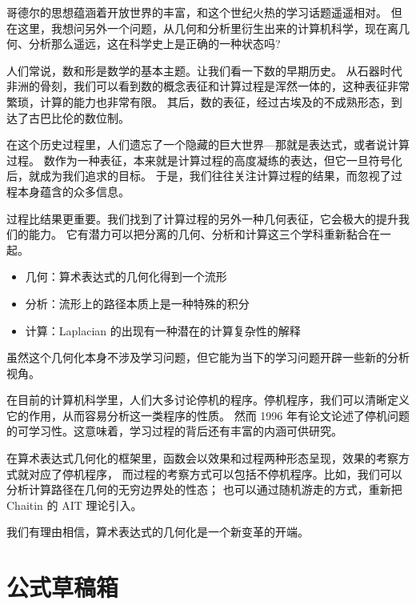 \documentclass[a4paper,12pt]{article}
\numberwithin{definition}{section}
\numberwithin{lemma}{section}
\numberwithin{proposition}{section}
\numberwithin{theorem}{section}
\numberwithin{grammar}{section}
\numberwithin{program}{section}
\numberwithin{convention}{section}
\numberwithin{corollary}{section}
\begin{document}
哥德尔的思想蕴涵着开放世界的丰富，和这个世纪火热的学习话题遥遥相对。
但在这里，我想问另外一个问题，从几何和分析里衍生出来的计算机科学，现在离几何、分析那么遥远，这在科学史上是正确的一种状态吗?

人们常说，数和形是数学的基本主题。让我们看一下数的早期历史。
从石器时代非洲的骨刻，我们可以看到数的概念表征和计算过程是浑然一体的，这种表征非常繁琐，计算的能力也非常有限。
其后，数的表征，经过古埃及的不成熟形态，到达了古巴比伦的数位制。

在这个历史过程里，人们遗忘了一个隐藏的巨大世界—那就是表达式，或者说计算过程。
数作为一种表征，本来就是计算过程的高度凝练的表达，但它一旦符号化后，就成为我们追求的目标。
于是，我们往往关注计算过程的结果，而忽视了过程本身蕴含的众多信息。

过程比结果更重要。我们找到了计算过程的另外一种几何表征，它会极大的提升我们的能力。
它有潜力可以把分离的几何、分析和计算这三个学科重新黏合在一起。

\begin{itemize}
    \item 几何：算术表达式的几何化得到一个流形
    \item 分析：流形上的路径本质上是一种特殊的积分
    \item 计算：Laplacian 的出现有一种潜在的计算复杂性的解释
\end{itemize}

虽然这个几何化本身不涉及学习问题，但它能为当下的学习问题开辟一些新的分析视角。

在目前的计算机科学里，人们大多讨论停机的程序。停机程序，我们可以清晰定义它的作用，从而容易分析这一类程序的性质。
然而 1996 年有论文论述了停机问题的可学习性。这意味着，学习过程的背后还有丰富的内涵可供研究。

在算术表达式几何化的框架里，函数会以效果和过程两种形态呈现，效果的考察方式就对应了停机程序，
而过程的考察方式可以包括不停机程序。比如，我们可以分析计算路径在几何的无穷边界处的性态；
也可以通过随机游走的方式，重新把 Chaitin 的 AIT 理论引入。

我们有理由相信，算术表达式的几何化是一个新变革的开端。

\newpage
{}
{}



\newpage
\appendix

\section{公式草稿箱}
\end{document}
